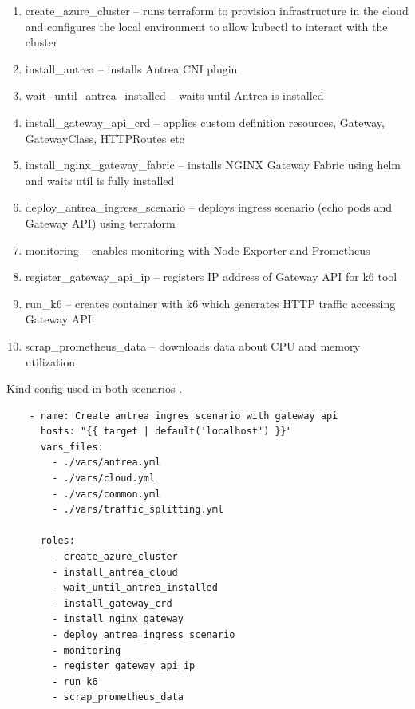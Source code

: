 \begin{enumerate}
  \item create\_azure\_cluster -- runs terraform to provision infrastructure in the cloud and configures the local environment to allow kubectl to interact with the cluster
  \item install\_antrea -- installs Antrea CNI plugin
  \item wait\_until\_antrea\_installed -- waits until Antrea is installed
  \item install\_gateway\_api\_crd -- applies custom definition resources, Gateway, GatewayClass, HTTPRoutes etc
  \item install\_nginx\_gateway\_fabric -- installs NGINX Gateway Fabric using helm and waits util is fully installed
  \item deploy\_antrea\_ingress\_scenario -- deploys ingress scenario (echo pods and Gateway API) using terraform
  \item monitoring -- enables monitoring with Node Exporter and Prometheus
  \item register\_gateway\_api\_ip -- registers IP address of Gateway API for k6 tool
  \item run\_k6 -- creates container with k6 which generates HTTP traffic accessing Gateway API
  \item scrap\_prometheus\_data -- downloads data about CPU and memory utilization
\end{enumerate}

\begin{listing}[H]
  \centering
  \caption{Kind config used in both scenarios \cite{KindConfig}.}
  \begin{verbatim}
    - name: Create antrea ingres scenario with gateway api
      hosts: "{{ target | default('localhost') }}"
      vars_files:
        - ./vars/antrea.yml
        - ./vars/cloud.yml
        - ./vars/common.yml
        - ./vars/traffic_splitting.yml

      roles:
        - create_azure_cluster
        - install_antrea_cloud
        - wait_until_antrea_installed
        - install_gateway_crd
        - install_nginx_gateway
        - deploy_antrea_ingress_scenario
        - monitoring
        - register_gateway_api_ip
        - run_k6
        - scrap_prometheus_data
  \end{verbatim}
  \label{lst:antreaIngressPlaybook}
\end{listing}


